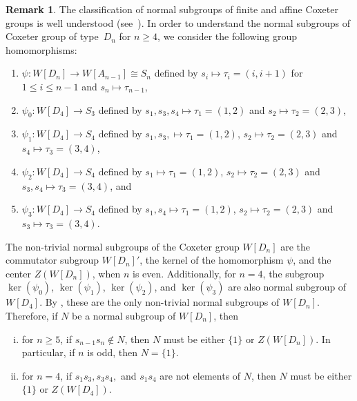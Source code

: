 \documentclass[12pt]{amsart}
\theoremstyle{definition}
\newtheorem{remark}[equation]{Remark}
\numberwithin{equation}{section}
\begin{document}
\begin{remark}\label{rmknormalDn}
The classification of normal subgroups of finite and affine Coxeter groups is well understood (see~\cite{MR1490241}). In order to understand the normal subgroups of Coxeter group of type~$D_n $ for $n \geq 4$, we consider the following group homomorphisms: 
\begin{enumerate}
\item $\psi:W[D_n] \to W[A_{n-1}]\cong S_n$ defined by $s_{i} \mapsto \tau_i=(i, i+1)$ for $ 1 \leq i \leq n-1$ and $s_n \mapsto \tau_{n-1}$, 
\item $\psi_0:W[D_4]\to S_3$  defined by $s_1, s_3, s_4 \mapsto \tau_1=(1,2)$ and $s_2 \mapsto \tau_2=(2,3)$,
\item $\psi_1:W[D_4]\to S_4$ defined by $s_1, s_3, \mapsto \tau_1=(1,2)$, $s_2 \mapsto \tau_2=(2,3)$ and $s_4 \mapsto \tau_3=(3,4)$,
\item $\psi_2:W[D_4]\to S_4$ defined by $s_1 \mapsto \tau_1=(1,2)$, $s_2 \mapsto \tau_2=(2,3)$ and  $s_3,s_4 \mapsto \tau_3=(3,4)$, and
\item $\psi_3:W[D_4]\to S_4$ defined by $s_1, s_4 \mapsto \tau_1=(1,2)$, $s_2 \mapsto \tau_2=(2,3)$ and  $s_3 \mapsto \tau_3=(3,4)$.
\end{enumerate}
 The non-trivial normal subgroups of the Coxeter group $W[D_n]$ are the commutator subgroup $W[D_n]'$, the kernel of the homomorphism $\psi$, and the center $Z(W[D_n])$, when $n$ is even.  Additionally, for $n=4$, the subgroup $\ker(\psi_0)$, $\ker(\psi_1)$, $\ker(\psi_2)$, and $\ker(\psi_3)$ are also normal subgroup of $W[D_4]$. By \cite{MR1490241}, these are the only non-trivial normal subgroups of $W[D_n]$. Therefore, if $N$ be a normal subgroup of $W[D_n]$, then 
 \begin{enumerate}[(i)]
\item for $n \geq 5$, if $s_{n-1}s_{n} \not \in N$, then $N$ must be either $\{1\}$ or $Z(W[D_n])$. In particular, if $n$ is odd, then $N=\{1\}$. 
\item for  $n=4$, if $s_1s_3, s_3s_4,$ and $s_1s_4$ are not elements of $N$, then $N$ must be either $\{1\}$ or $Z(W[D_4])$.
\end{enumerate}
\end{remark}


\medskip
\end{document}
